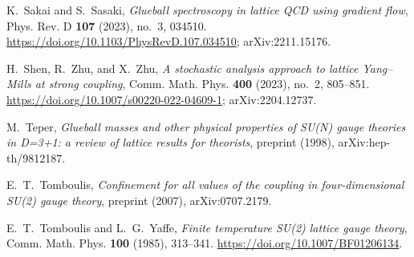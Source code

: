 K.~Sakai and S.~Sasaki, \emph{Glueball spectroscopy in lattice QCD using gradient flow},
Phys. Rev. D \textbf{107} (2023), no.~3, 034510.
\url{https://doi.org/10.1103/PhysRevD.107.034510}; arXiv:2211.15176.

H.~Shen, R.~Zhu, and X.~Zhu, \emph{A stochastic analysis approach to lattice Yang--Mills at strong coupling},
Comm. Math. Phys. \textbf{400} (2023), no.~2, 805--851.
\url{https://doi.org/10.1007/s00220-022-04609-1}; arXiv:2204.12737.

M.~Teper, \emph{Glueball masses and other physical properties of SU(N) gauge theories in D=3+1: a review of lattice results for theorists},
preprint (1998), arXiv:hep-th/9812187.

E.~T.~Tomboulis, \emph{Confinement for all values of the coupling in four-dimensional SU(2) gauge theory},
preprint (2007), arXiv:0707.2179.

E.~T.~Tomboulis and L.~G.~Yaffe, \emph{Finite temperature SU(2) lattice gauge theory},
Comm. Math. Phys. \textbf{100} (1985), 313--341.
\url{https://doi.org/10.1007/BF01206134}.
